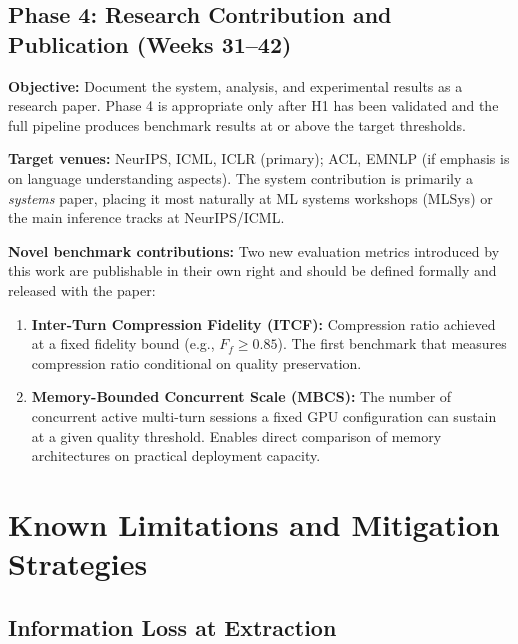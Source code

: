 \documentclass[11pt, a4paper, twoside]{article}
\theoremstyle{definition}
\begin{document}
\subsection{Phase 4: Research Contribution and Publication (Weeks 31--42)}
\label{sec:phase4}

\textbf{Objective:} Document the system, analysis, and experimental results as a
research paper. Phase 4 is appropriate only after H1 has been validated and the
full pipeline produces benchmark results at or above the target thresholds.

\medskip

\textbf{Target venues:} NeurIPS, ICML, ICLR (primary); ACL, EMNLP (if emphasis
is on language understanding aspects). The system contribution is primarily
a \textit{systems} paper, placing it most naturally at ML systems workshops
(MLSys) or the main inference tracks at NeurIPS/ICML.

\medskip

\textbf{Novel benchmark contributions:}
Two new evaluation metrics introduced by this work are publishable in their own
right and should be defined formally and released with the paper:

\begin{enumerate}[leftmargin=*]
  \item \textbf{Inter-Turn Compression Fidelity (ITCF):} Compression ratio
    achieved at a fixed fidelity bound (e.g., $F_f \geq 0.85$). The first
    benchmark that measures compression ratio conditional on quality preservation.
  \item \textbf{Memory-Bounded Concurrent Scale (MBCS):} The number of concurrent
    active multi-turn sessions a fixed GPU configuration can sustain at a given
    quality threshold. Enables direct comparison of memory architectures on
    practical deployment capacity.
\end{enumerate}

\section{Known Limitations and Mitigation Strategies}
\label{sec:limitations}

\subsection{Information Loss at Extraction}
\end{document}
